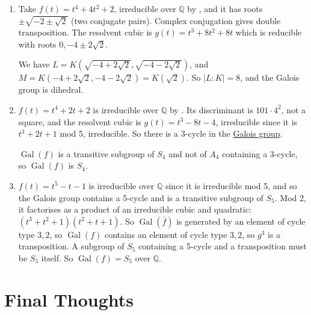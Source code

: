 \documentclass{article}
\DeclareMathOperator{\Gal}{Gal}
\begin{document}
\begin{eg}\leavevmode
    \begin{enumerate}[label=(\arabic*)]
        \item Take $f(t)=t^4+4t^2+2$, irreducible over $\mathbb{Q}$ by , and it has roots $\pm \sqrt{-2\pm\sqrt{2}}$ (two conjugate pairs).
            Complex conjugation gives double transposition.
            The resolvent cubic is $g(t) = t^3 + 8t^2+8t$ which is reducible with roots $0, -4 \pm 2 \sqrt{2}$.

            We have $L = K(\sqrt{-4+2 \sqrt{2}}, \sqrt{-4 - 2 \sqrt{2}})$, and $M = K(-4 + 2 \sqrt{2}, -4-2 \sqrt{2}) = K(\sqrt{2})$.
            So $|L:K|=8$, and the Galois group is dihedral.
        \item $f(t) = t^4 + 2t + 2$ is irreducible over $\mathbb{Q}$ by .
            Its discriminant is $101 \cdot 4^2$, not a square, and the resolvent cubic is $g(t) = t^3 - 8t - 4$, irreducible since it is $t^3 + 2t+1$ mod 5, irreducible.
            So there is a 3-cycle in the \hyperlink{def:ggPoly}{Galois group}.

            $\Gal(f)$ is a transitive subgroup of $S_4$ and not of $A_4$ containing a 3-cycle, so $\Gal(f)$ is $S_4$.
        \item $f(t) = t^5-t-1$ is irreducible over $\mathbb{Q}$ since it is irreducible mod 5, and so the Galois group contains a 5-cycle and is a transitive subgroup of $S_5$.
            Mod 2, it factorises as a product of an irreducible cubic and quadratic: $(t^3+t^2+1)(t^2+t+1)$. So $\Gal(\bar{f})$ is generated by an element of cycle type $3,2$, so $\Gal(f)$ contains an element of cycle type $3,2$, so $g^3$ is a transposition.
            A subgroup of $S_5$ containing a 5-cycle and a transposition must be $S_5$ itself. So $\Gal(f) = S_5$ over $\mathbb{Q}$.
    \end{enumerate}
\end{eg}

\clearpage
\section{Final Thoughts}
\end{document}
